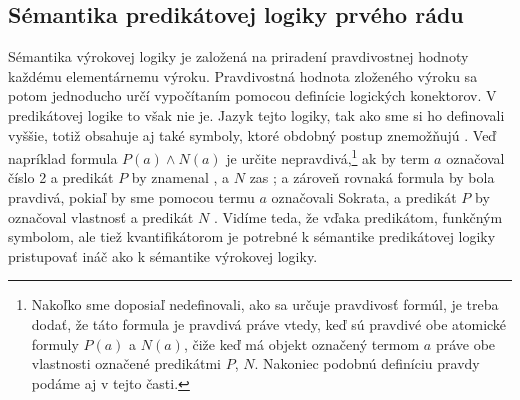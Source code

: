 \documentclass[12pt, letterpaper]{article}
\begin{document}
\subsection{Sémantika predikátovej logiky prvého rádu} 
\label{sem}
Sémantika výrokovej logiky je založená na priradení pravdivostnej hodnoty každému elementárnemu výroku. Pravdivostná hodnota zloženého výroku sa potom jednoducho určí vypočítaním pomocou definície logických konektorov. V predikátovej logike to však  nie je. Jazyk tejto logiky, tak ako sme si ho definovali vyššie, totiž obsahuje aj také symboly, ktoré obdobný postup znemožňujú \parencites[35--36]{peregrin_logika_2004}[40]{raclavsky_uvod_2015}. Veď napríklad formula $P(a) \land N(a)$ je určite nepravdivá,\footnote{Nakoľko sme doposiaľ nedefinovali, ako sa určuje pravdivosť formúl, je treba dodať, že táto formula je pravdivá práve vtedy, keď sú pravdivé obe atomické formuly $P(a)$ a $N(a)$, čiže keď má objekt označený termom $a$ práve obe vlastnosti označené predikátmi $P$, $N$. Nakoniec podobnú definíciu pravdy podáme aj v tejto časti.} ak by term $a$ označoval číslo 2 a predikát $P$ by znamenal , a $N$ zas ; a zároveň rovnaká formula by bola pravdivá, pokiaľ by sme pomocou termu $a$ označovali Sokrata, a predikát $P$ by označoval vlastnosť  a predikát $N$ . Vidíme teda, že vďaka predikátom, funkčným symbolom, ale tiež kvantifikátorom je potrebné k sémantike predikátovej logiky pristupovať ináč ako k sémantike výrokovej logiky.
\end{document}
